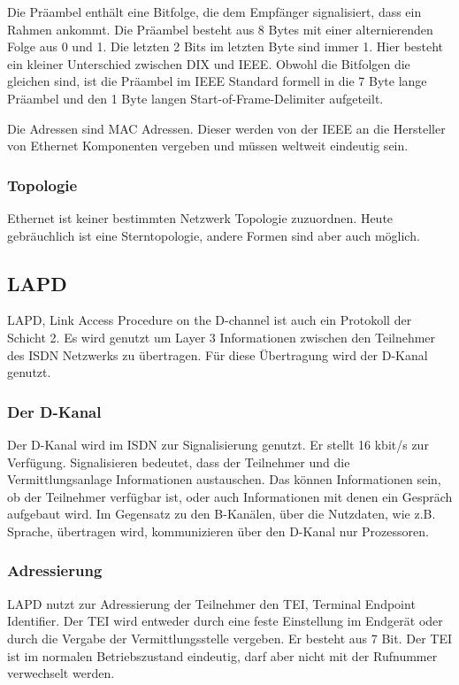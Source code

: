 \documentclass[12pt, a4paper, ngerman]{article}
\begin{document}
Die Präambel enthält eine Bitfolge, die dem Empfänger signalisiert, dass ein Rahmen ankommt. Die Präambel besteht aus 8 Bytes mit einer alternierenden Folge aus 0 und 1. Die letzten 2 Bits im letzten Byte sind immer 1. Hier besteht ein kleiner Unterschied zwischen DIX und IEEE. Obwohl die Bitfolgen die gleichen sind, ist die Präambel im IEEE Standard formell in die 7 Byte lange Präambel und den 1 Byte langen Start-of-Frame-Delimiter aufgeteilt.
 
Die Adressen sind MAC Adressen. Dieser werden von der IEEE an die Hersteller von Ethernet Komponenten vergeben und müssen weltweit eindeutig sein.

\subsubsection{Topologie}
Ethernet ist keiner bestimmten Netzwerk Topologie zuzuordnen. Heute gebräuchlich ist eine Sterntopologie, andere Formen sind aber auch möglich.   

\subsection{LAPD}
LAPD, Link Access Procedure on the D-channel ist auch ein Protokoll der Schicht 2. Es wird genutzt um Layer 3 Informationen zwischen den Teilnehmer des ISDN Netzwerks zu übertragen. Für diese Übertragung wird der D-Kanal genutzt.

\subsubsection{Der D-Kanal}
Der D-Kanal wird im ISDN zur Signalisierung genutzt. Er stellt 16 kbit/s zur Verfügung. Signalisieren bedeutet, dass der Teilnehmer und die Vermittlungsanlage Informationen austauschen. Das können Informationen sein, ob der Teilnehmer verfügbar ist, oder auch Informationen mit denen ein Gespräch aufgebaut wird. Im Gegensatz zu den B-Kanälen, über die Nutzdaten, wie z.B. Sprache, übertragen wird, kommunizieren über den D-Kanal nur Prozessoren.

\subsubsection{Adressierung \label{tei}}
LAPD nutzt zur Adressierung der Teilnehmer den TEI, Terminal Endpoint Identifier. Der TEI wird entweder durch eine feste Einstellung im Endgerät oder durch die Vergabe der Vermittlungsstelle vergeben. Er besteht aus 7 Bit. Der TEI ist im normalen Betriebszustand eindeutig, darf aber nicht mit der Rufnummer verwechselt werden.
\end{document}
